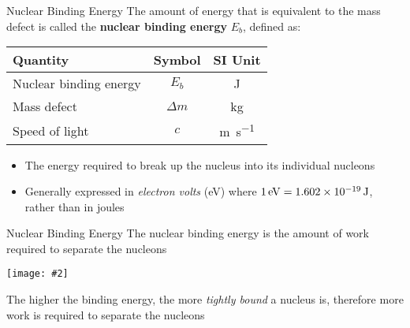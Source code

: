 \documentclass[12pt,compress,aspectratio=169]{beamer}
\newcommand{\pic}[2]{\texttt{[image: \#2]}}
\newcommand{\eq}[2]{
  \vspace{#1}{\Large\begin{displaymath}#2\end{displaymath}}
}
\begin{document}
\begin{frame}{Nuclear Binding Energy}
  The amount of energy that is equivalent to the mass defect is called the
  \textbf{nuclear binding energy} $E_b$, defined as:

  \eq{-.2in}{
    \boxed{E_b=(\Delta m)c^2}
  }
  \begin{center}
    \begin{tabular}{l|c|c}
      \rowcolor{pink}
      \textbf{Quantity}      & \textbf{Symbol} & \textbf{SI Unit} \\ \hline
      Nuclear binding energy & $E_b$      & \si{\joule}\\
      Mass defect            & $\Delta m$ & \si{\kilo\gram}\\
      Speed of light         & $c$        & \si{\metre\per\second}
    \end{tabular}
  \end{center}
  \begin{itemize}
  \item The energy required to break up the nucleus into its individual
    nucleons
  \item Generally expressed in \emph{electron volts} (\si{\electronvolt})
    where $\SI1{\electronvolt}=\SI{1.602e-19}{\joule}$, rather than in joules
  \end{itemize}
\end{frame}



\begin{frame}{Nuclear Binding Energy}
  The nuclear binding energy is the amount of work required to separate the
  nucleons
  \begin{center}
    \pic{.5}{graphics/CNX_UPhysics_43_02_BindEnergy}
  \end{center}
  The higher the binding energy, the more \emph{tightly bound} a nucleus is,
  therefore more work is required to separate the nucleons
\end{frame}
\end{document}

